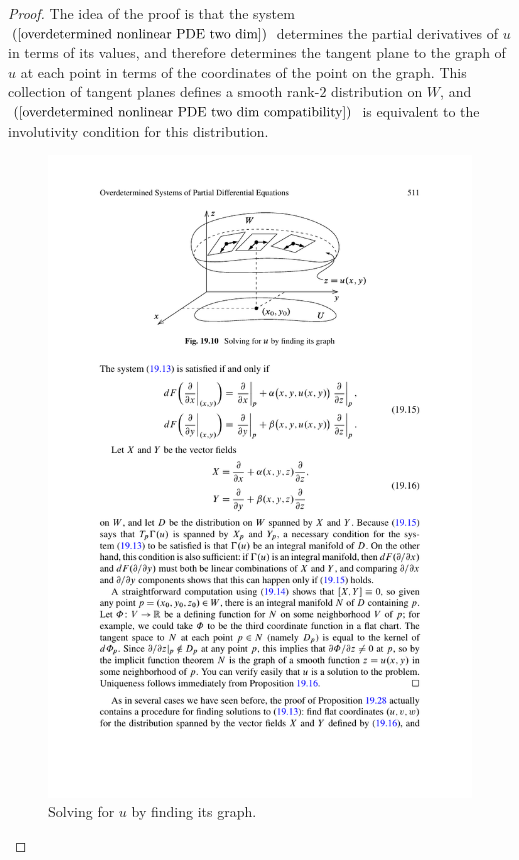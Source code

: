 \begin{proof}
The idea of the proof is that the system $(\ref{overdetermined nonlinear PDE two dim})$ determines the partial derivatives of $u$ in terms of its values, and therefore determines the tangent plane to the graph of $u$ at each point in terms of the coordinates of the point on the graph. This collection of tangent planes defines a smooth rank-$2$ distribution on $W$, and $(\ref{overdetermined nonlinear PDE two dim compatibility})$ is equivalent to the involutivity condition for this distribution.
\begin{figure}[htbp]
\centering
\includegraphics{pictures/overdetermined-PDE}
\caption{Solving for $u$ by finding its graph.}
\end{figure}


\end{proof}
